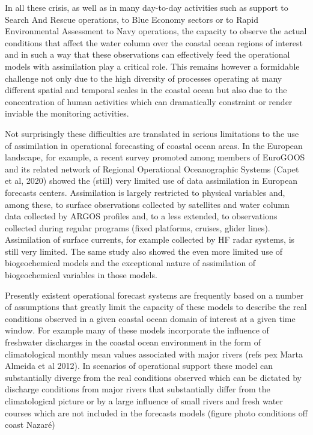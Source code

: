 In all these crisis, as well as in many day-to-day activities such as
support to Search And Rescue operations, to Blue Economy sectors or to
Rapid Environmental Assessment to Navy operations, the capacity to
observe the actual conditions that affect the water column over the
coastal ocean regions of interest and in such a way that these
observations can effectively feed the operational models with
assimilation play a critical role. This remains however a formidable
challenge not only due to the high diversity of processes operating at
many different spatial and temporal scales in the coastal ocean but also
due to the concentration of human activities which can dramatically
constraint or render inviable the monitoring activities.

Not surprisingly these difficulties are translated in serious
limitations to the use of assimilation in operational forecasting of
coastal ocean areas. In the European landscape, for example, a recent
survey promoted among members of EuroGOOS and its related network of
Regional Operational Oceanographic Systems (Capet et al, 2020) showed
the (still) very limited use of data assimilation in European forecasts
centers. Assimilation is largely restricted to physical variables and,
among these, to surface observations collected by satellites and water
column data collected by ARGOS profiles and, to a less extended, to
observations collected during regular programs (fixed platforms,
cruises, glider lines). Assimilation of surface currents, for example
collected by HF radar systems, is still very limited. The same study
also showed the even more limited use of biogeochemical models and the
exceptional nature of assimilation of biogeochemical variables in those
models.
 
Presently existent operational forecast systems are frequently based on
a number of assumptions that greatly limit the capacity of these models
to describe the real conditions observed in a given coastal ocean domain
of interest at a given time window. For example many of these models
incorporate the influence of freshwater discharges in the coastal ocean
environment in the form of climatological monthly mean values associated
with major rivers (refs pex Marta Almeida et al 2012). In scenarios of
operational support these model can substantially diverge from the real
conditions observed which can be dictated by discharge conditions from
major rivers that substantially differ from the climatological picture
or by a large influence of small rivers and fresh water courses which
are not included in the forecasts models (figure photo conditions off
coast Nazaré)
 
